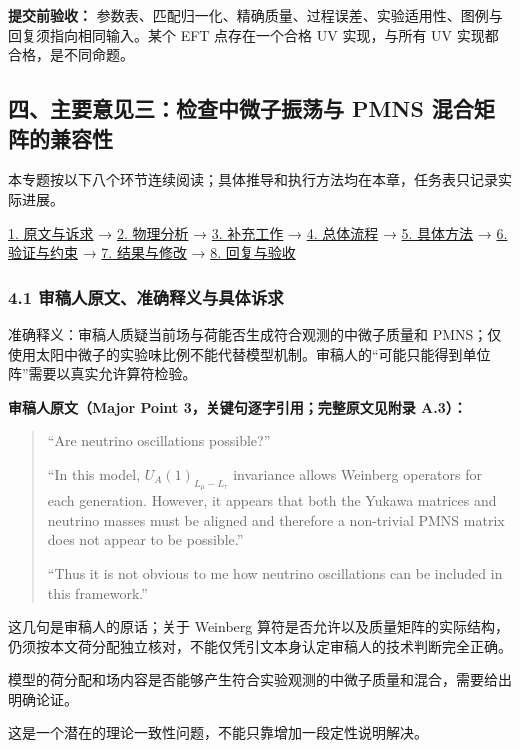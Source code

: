 \documentclass[
  chinese,
  UTF8]{ctexart}
\begin{document}
\textbf{提交前验收：}
参数表、匹配归一化、精确质量、过程误差、实验适用性、图例与回复须指向相同输入。某个
EFT 点存在一个合格 UV 实现，与所有 UV 实现都合格，是不同命题。

\subsection{四、主要意见三：检查中微子振荡与 PMNS
混合矩阵的兼容性}\label{major-3}

本专题按以下八个环节连续阅读；具体推导和执行方法均在本章，任务表只记录实际进展。

\hyperref[major-3-step-1]{1. 原文与诉求} → \hyperref[major-3-step-2]{2.
物理分析} → \hyperref[major-3-step-3]{3. 补充工作} →
\hyperref[major-3-step-4]{4. 总体流程} → \hyperref[major-3-step-5]{5.
具体方法} → \hyperref[major-3-step-6]{6. 验证与约束} →
\hyperref[major-3-step-7]{7. 结果与修改} → \hyperref[major-3-step-8]{8.
回复与验收}

\subsubsection{4.1 审稿人原文、准确释义与具体诉求}\label{major-3-step-1}

准确释义：审稿人质疑当前场与荷能否生成符合观测的中微子质量和
PMNS；仅使用太阳中微子的实验味比例不能代替模型机制。审稿人的``可能只能得到单位阵''需要以真实允许算符检验。

\textbf{审稿人原文（Major Point 3，关键句逐字引用；完整原文见附录
A.3）：}

\begin{quote}
``Are neutrino oscillations possible?''

``In this model, \(U_A(1)_{L_\mu-L_\tau}\) invariance allows Weinberg
operators for each generation. However, it appears that both the Yukawa
matrices and neutrino masses must be aligned and therefore a non-trivial
PMNS matrix does not appear to be possible.''

``Thus it is not obvious to me how neutrino oscillations can be included
in this framework.''
\end{quote}

这几句是审稿人的原话；关于 Weinberg
算符是否允许以及质量矩阵的实际结构，仍须按本文荷分配独立核对，不能仅凭引文本身认定审稿人的技术判断完全正确。

模型的荷分配和场内容是否能够产生符合实验观测的中微子质量和混合，需要给出明确论证。

这是一个潜在的理论一致性问题，不能只靠增加一段定性说明解决。
\end{document}

